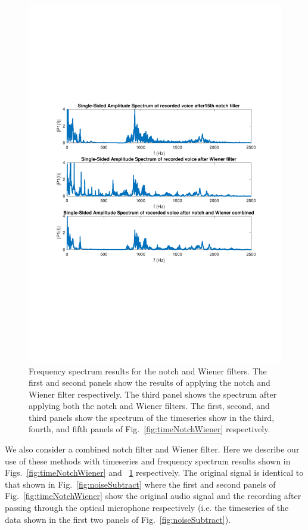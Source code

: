 \documentclass[paper-main.tex]{subfiles}
\begin{document}
\begin{figure}
\begin{center}
\includegraphics[width=\textwidth,trim={0cm 8.2cm 0cm 8cm},clip]{figures/freqNotchWiener.pdf}
\end{center}
\caption{\label{fig:freqNotchWiener}
Frequency spectrum results for the notch and Wiener filters. 
The first and second panels show the results of applying the notch and Wiener filter respectively.
The third panel shows the spectrum after applying both the notch and Wiener filters. 
The first, second, and third panels show the spectrum of the timeseries show in the third, fourth, and fifth panels of Fig.~\ref{fig:timeNotchWiener} respectively. 
}
\end{figure}



We also consider a combined notch filter and Wiener filter. 
Here we describe our use of these methods with timeseries and frequency spectrum results shown in Figs.~\ref{fig:timeNotchWiener} and ~\ref{fig:freqNotchWiener} respectively. 
The original signal is identical to that shown in Fig.~\ref{fig:noiseSubtract} where the first and second panels of Fig.~\ref{fig:timeNotchWiener} show the original audio signal and the recording after passing through the optical microphone respectively (i.e. the timeseries of the data shown in the first two panels of Fig.~\ref{fig:noiseSubtract}). 
\end{document}
